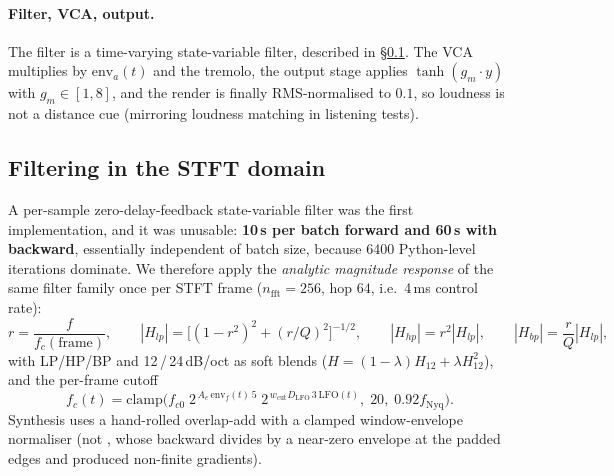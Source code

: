 \documentclass[11pt]{article}
\newcommand{\code}[1]{\texttt{\detokenize{#1}}}
\begin{document}
\paragraph{Filter, VCA, output.} The filter is a time-varying state-variable
filter, described in \S\ref{sec:filter}. The VCA multiplies by
$\mathrm{env}_a(t)$ and the tremolo, the output stage applies
$\tanh(g_m \cdot y)$ with $g_m \in [1,8]$, and the render is finally
RMS-normalised to $0.1$, so loudness is not a distance cue (mirroring loudness
matching in listening tests).

\subsection{Filtering in the STFT domain}\label{sec:filter}

A per-sample zero-delay-feedback state-variable filter \cite{zavalishin} was the
first implementation, and it was unusable: \textbf{10\,s per batch forward and
60\,s with backward}, essentially independent of batch size, because 6400
Python-level iterations dominate. We therefore apply the \emph{analytic
magnitude response} of the same filter family once per STFT frame
($n_{\text{fft}}=256$, hop $64$, i.e.\ 4\,ms control rate):
\begin{equation}
r = \frac{f}{f_c(\text{frame})},\qquad
|H_{lp}| = \big[(1-r^2)^2 + (r/Q)^2\big]^{-1/2},\qquad
|H_{hp}| = r^2|H_{lp}|,\qquad |H_{bp}| = \frac{r}{Q}|H_{lp}|,
\label{eq:svf}
\end{equation}
with LP/HP/BP and 12\,/\,24\,dB/oct as soft blends
($H = (1-\lambda)H_{12} + \lambda H_{12}^2$), and the per-frame cutoff
\begin{equation}
f_c(t) = \mathrm{clamp}\Big(f_{c0}\; 2^{\,A_e\,\mathrm{env}_f(t)\,5}\;
2^{\,w_{\text{cut}} D_{\text{LFO}}\,3\,\mathrm{LFO}(t)},\; 20,\; 0.92 f_{\text{Nyq}}\Big).
\end{equation}
Synthesis uses a hand-rolled overlap-add with a clamped window-envelope
normaliser (not \code{torch.istft}, whose backward divides by a near-zero
envelope at the padded edges and produced non-finite gradients).
\end{document}
